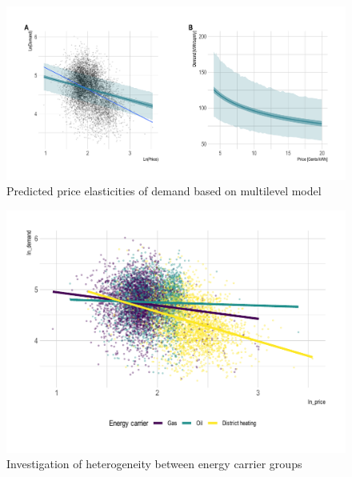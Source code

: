 \documentclass[12pt,twoside]{reedthesis}
\begin{document}
\begin{figure}

{\centering \includegraphics[width=1.04\linewidth]{figure/bm2_prediction} 

}

\caption{Predicted price elasticities of demand based on multilevel model}\label{fig:elasticity-predictions-bm2}
\end{figure}
\begin{figure}

{\centering \includegraphics[width=1\linewidth]{figure/carrier_heterogeneity_plot} 

}

\caption{Investigation of heterogeneity between energy carrier groups}\label{fig:heterogeneity-energy-carrier-plot}
\end{figure}
\end{document}
